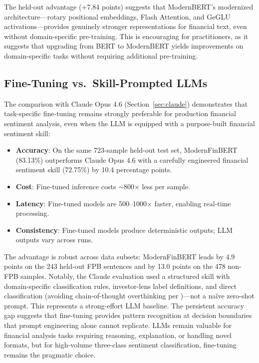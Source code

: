 \documentclass[11pt]{article}
\begin{document}
The held-out advantage (+7.84 points) suggests that ModernBERT's modernized architecture---rotary positional embeddings, Flash Attention, and GeGLU activations---provides genuinely stronger representations for financial text, even without domain-specific pre-training. This is encouraging for practitioners, as it suggests that upgrading from BERT to ModernBERT yields improvements on domain-specific tasks without requiring additional pre-training.

\subsection{Fine-Tuning vs.\ Skill-Prompted LLMs}

The comparison with Claude Opus 4.6 (Section~\ref{sec:claude}) demonstrates that task-specific fine-tuning remains strongly preferable for production financial sentiment analysis, even when the LLM is equipped with a purpose-built financial sentiment skill:

\begin{itemize}[nosep]
    \item \textbf{Accuracy}: On the same 723-sample held-out test set, ModernFinBERT (83.13\%) outperforms Claude Opus 4.6 with a carefully engineered financial sentiment skill (72.75\%) by 10.4 percentage points.
    \item \textbf{Cost}: Fine-tuned inference costs $\sim$800$\times$ less per sample.
    \item \textbf{Latency}: Fine-tuned models are 500--1000$\times$ faster, enabling real-time processing.
    \item \textbf{Consistency}: Fine-tuned models produce deterministic outputs; LLM outputs vary across runs.
\end{itemize}

The advantage is robust across data subsets: ModernFinBERT leads by 4.9 points on the 243 held-out FPB sentences and by 13.0 points on the 478 non-FPB samples. Notably, the Claude evaluation used a structured skill with domain-specific classification rules, investor-lens label definitions, and direct classification (avoiding chain-of-thought overthinking per \citealt{vamvourellis2025overthinking})---not a na\"ive zero-shot prompt. This represents a strong-effort LLM baseline. The persistent accuracy gap suggests that fine-tuning provides pattern recognition at decision boundaries that prompt engineering alone cannot replicate. LLMs remain valuable for financial analysis tasks requiring reasoning, explanation, or handling novel formats, but for high-volume three-class sentiment classification, fine-tuning remains the pragmatic choice.
\end{document}
